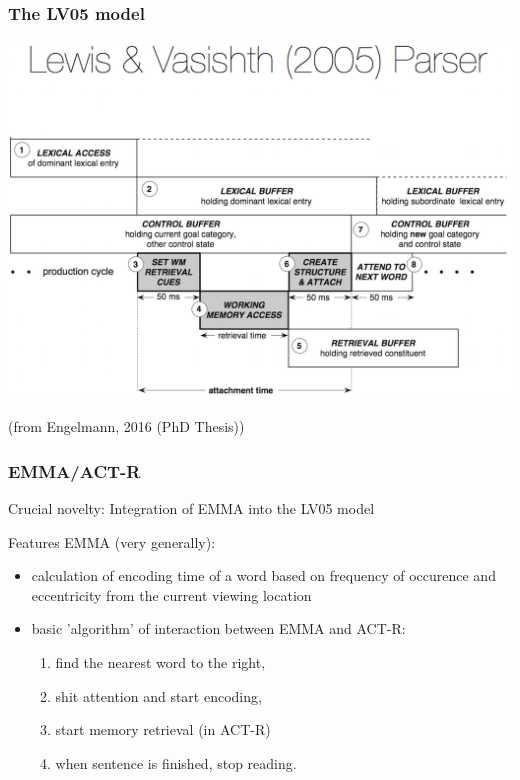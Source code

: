 \documentclass{beamer}
\begin{document}
\begin{frame}
  \frametitle{The LV05 model}

  \begin{center}
    \includegraphics[scale=.27]{LV05parser}
  \end{center}

  (from Engelmann, 2016 (PhD Thesis))
\end{frame}

\begin{frame}
  \frametitle{EMMA/ACT-R \citep{Engelmann2013}}
  
  Crucial novelty: Integration of EMMA \citep{Salvucci2001} into the LV05 model
  
  Features EMMA (very generally):

  \begin{itemize}
    \item calculation of encoding time of a word based on frequency of occurence and eccentricity from the current viewing location
    \item basic 'algorithm' of interaction between EMMA and ACT-R:
      \begin{enumerate}
        \item find the nearest word to the right,
        \item shit attention and start encoding,
        \item start memory retrieval (in ACT-R)
        \item when sentence is finished, stop reading.
      \end{enumerate}
  \end{itemize}
\end{frame}
\end{document}
